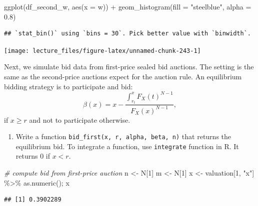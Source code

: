 \documentclass[
]{book}
\newenvironment{Shaded}{\begin{snugshade}}{\end{snugshade}}
\newcommand{\AttributeTok}[1]{\textcolor[rgb]{0.77,0.63,0.00}{#1}}
\newcommand{\CommentTok}[1]{\textcolor[rgb]{0.56,0.35,0.01}{\textit{#1}}}
\newcommand{\DecValTok}[1]{\textcolor[rgb]{0.00,0.00,0.81}{#1}}
\newcommand{\FloatTok}[1]{\textcolor[rgb]{0.00,0.00,0.81}{#1}}
\newcommand{\FunctionTok}[1]{\textcolor[rgb]{0.00,0.00,0.00}{#1}}
\newcommand{\NormalTok}[1]{#1}
\newcommand{\OtherTok}[1]{\textcolor[rgb]{0.56,0.35,0.01}{#1}}
\newcommand{\SpecialCharTok}[1]{\textcolor[rgb]{0.00,0.00,0.00}{#1}}
\newcommand{\StringTok}[1]{\textcolor[rgb]{0.31,0.60,0.02}{#1}}
\providecommand{\tightlist}{%
  \setlength{\itemsep}{0pt}\setlength{\parskip}{0pt}}
\begin{document}
\begin{Shaded}
\begin{Highlighting}[]
\FunctionTok{ggplot}\NormalTok{(df\_second\_w, }\FunctionTok{aes}\NormalTok{(}\AttributeTok{x =}\NormalTok{ w)) }\SpecialCharTok{+} \FunctionTok{geom\_histogram}\NormalTok{(}\AttributeTok{fill =} \StringTok{"steelblue"}\NormalTok{, }\AttributeTok{alpha =} \FloatTok{0.8}\NormalTok{)}
\end{Highlighting}
\end{Shaded}

\begin{verbatim}
## `stat_bin()` using `bins = 30`. Pick better value with `binwidth`.
\end{verbatim}

\begin{center}\texttt{[image: lecture\_files/figure-latex/unnamed-chunk-243-1]} \end{center}

Next, we simulate bid data from first-price sealed bid auctions. The setting is the same as the second-price auctions expect for the auction rule. An equilibrium bidding strategy is to participate and bid:
\[
\beta(x) = x - \frac{\int_{r_t}^x F_X(t)^{N - 1}}{F_X(x)^{N - 1}},
\]
if \(x \ge r\) and not to participate otherwise.

\begin{enumerate}
\def\labelenumi{\arabic{enumi}.}
\setcounter{enumi}{3}
\tightlist
\item
  Write a function \texttt{bid\_first(x,\ r,\ alpha,\ beta,\ n)} that returns the equilibrium bid. To integrate a function, use \texttt{integrate} function in R. It returns 0 if \(x < r\).
\end{enumerate}

\begin{Shaded}
\begin{Highlighting}[]
\CommentTok{\# compute bid from first{-}price auction}
\NormalTok{n }\OtherTok{\textless{}{-}}\NormalTok{ N[}\DecValTok{1}\NormalTok{]}
\NormalTok{m }\OtherTok{\textless{}{-}}\NormalTok{ N[}\DecValTok{1}\NormalTok{]}
\NormalTok{x }\OtherTok{\textless{}{-}}\NormalTok{ valuation[}\DecValTok{1}\NormalTok{, }\StringTok{"x"}\NormalTok{] }\SpecialCharTok{\%\textgreater{}\%} \FunctionTok{as.numeric}\NormalTok{(); x}
\end{Highlighting}
\end{Shaded}

\begin{verbatim}
## [1] 0.3902289
\end{verbatim}
\end{document}
